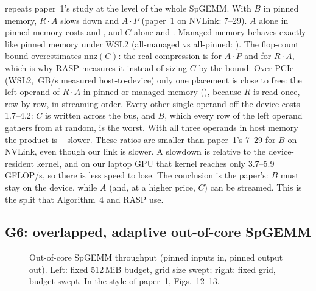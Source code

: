  repeats paper~1's study at the level of the whole SpGEMM. With $B$ in pinned memory, $R\cdot A$
slows down \x{} and $A\cdot P$ \x{} (paper~1 on NVLink: 7--29\x). $A$ alone
in pinned memory costs \x{} and \x, and $C$ alone \x{}
and \x. Managed memory behaves exactly like pinned memory under WSL2 (all-managed vs all-pinned:
\x). The flop-count bound overestimates $\mathrm{nnz}(C)$: the real compression is
 for $A\cdot P$ and  for $R\cdot A$, which is why RASP measures it instead of
sizing $C$ by the bound.
Over PCIe (WSL2, \,GB/s measured host-to-device) only one placement is close to free: the left
operand of $R\cdot A$ in pinned or managed memory (\x), because $R$ is read once, row by row, in
streaming order. Every other single operand off the device costs 1.7--4.2\x: $C$ is written across the bus, and $B$,
which every row of the left operand gathers from at random, is the worst. With all three operands in host memory the
product is --\x{} slower. These ratios are smaller than paper~1's
7--29\x{} for $B$ on NVLink, even though our link is slower. A slowdown is relative to the device-resident kernel, and
on our laptop GPU that kernel reaches only 3.7--5.9\,GFLOP/s, so there is less speed to lose. The conclusion is the
paper's: $B$ must stay on the device, while $A$ (and, at a higher price, $C$) can be streamed. This is the split that
Algorithm~4 and RASP use.

\subsection{G6: overlapped, adaptive out-of-core SpGEMM}\label{sec:eval-g6}
\begin{figure}[t]
\centering{}
\caption{Out-of-core SpGEMM throughput (pinned inputs in, pinned output out). Left: fixed 512\,MiB budget, grid size
swept; right: fixed grid, budget swept. In the style of paper~1, Figs.~12--13.}\label{fig:scaling}
\end{figure}

\begin{table}[t]
\centering\small
\caption{Ablation: speedup over Algorithm~4 (no overlap) on all configurations where the problem exceeds the budget
(geometric mean).}\label{tab:ablation}
\end{table}


